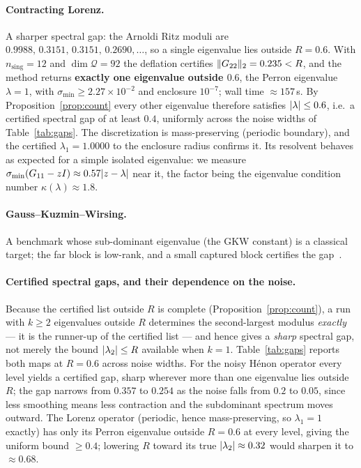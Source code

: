 \documentclass[11pt]{article}
\newcommand{\sigmin}{\sigma_{\min}}
\DeclarePairedDelimiter{\norm}{\lVert}{\rVert}
\DeclarePairedDelimiter{\abs}{\lvert}{\rvert}
\begin{document}
\paragraph{Contracting Lorenz.} A sharper spectral gap: the Arnoldi Ritz moduli are
$0.9988,\,0.3151,\,0.3151,\,0.2690,\dots$, so a single eigenvalue lies outside $R=0.6$. With
$n_{\mathrm{sing}}=12$ and $\dim\mathcal Q=92$ the deflation certifies $\norm{G_{22}}_2=0.235<R$, and
the method returns \textbf{exactly one eigenvalue outside $0.6$}, the Perron eigenvalue
$\lambda=1$, with $\sigmin\ge2.27\!\times\!10^{-2}$ and enclosure $10^{-7}$; wall time
$\approx157$\,s. By Proposition~\ref{prop:count} every other eigenvalue therefore satisfies
$\abs{\lambda}\le0.6$, i.e.\ a certified spectral gap of at least $0.4$, uniformly across the noise
widths of Table~\ref{tab:gaps}. The discretization is mass-preserving (periodic boundary), and the
certified $\lambda_1=1.0000$ to the enclosure radius confirms it. Its resolvent behaves as expected
for a simple isolated eigenvalue: we measure $\sigmin(G_{11}-zI)\approx0.57\abs{z-\lambda}$ near it,
the factor being the eigenvalue condition number $\kappa(\lambda)\approx1.8$.

\paragraph{Gauss--Kuzmin--Wirsing.} A benchmark whose sub-dominant eigenvalue (the GKW constant) is a
classical target; the far block is low-rank, and a small captured block certifies the gap~\cite{NisoliGauss}.

\paragraph{Certified spectral gaps, and their dependence on the noise.} Because the certified list
outside $R$ is complete (Proposition~\ref{prop:count}), a run with $k\ge2$ eigenvalues outside $R$
determines the second-largest modulus \emph{exactly} --- it is the runner-up of the certified list ---
and hence gives a \emph{sharp} spectral gap, not merely the bound $\abs{\lambda_2}\le R$ available
when $k=1$. Table~\ref{tab:gaps} reports both maps at $R=0.6$ across noise widths. For the noisy
H\'enon operator every level yields a certified gap, sharp wherever more than one eigenvalue lies
outside $R$; the gap narrows from $0.357$ to $0.254$ as the noise falls from $0.2$ to $0.05$, since
less smoothing means less contraction and the subdominant spectrum moves outward. The Lorenz operator
(periodic, hence mass-preserving, so $\lambda_1=1$ exactly) has only its Perron eigenvalue outside
$R=0.6$ at every level, giving the uniform bound $\ge0.4$; lowering $R$ toward its true
$\abs{\lambda_2}\approx0.32$ would sharpen it to $\approx0.68$.
\end{document}
